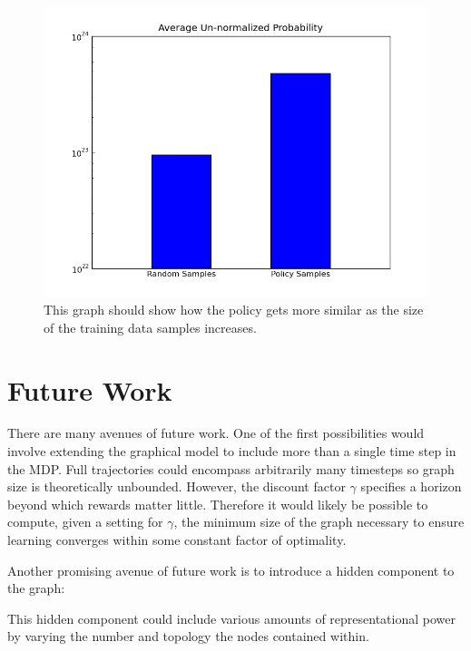 \documentclass{article} %
\begin{document}
\begin{figure}
  \centering
  \includegraphics[width=.7\textwidth]{figures/graph.png}
  \caption{This graph should show how the policy gets more similar as the size of the training data samples increases.}
  \label{fig:policysim}
\end{figure}


\section{Future Work}
There are many avenues of future work. One of the first possibilities would involve extending the graphical model to include more than a single time step in the MDP. Full trajectories could encompass arbitrarily many timesteps so graph size is theoretically unbounded. However, the discount factor $\gamma$ specifies a horizon beyond which rewards matter little. Therefore it would likely be possible to compute, given a setting for $\gamma$, the minimum size of the graph necessary to ensure learning converges within some constant factor of optimality. 

Another promising avenue of future work is to introduce a hidden component to the graph:


This hidden component could include various amounts of representational power by varying the number and topology the nodes contained within. 
\end{document}
